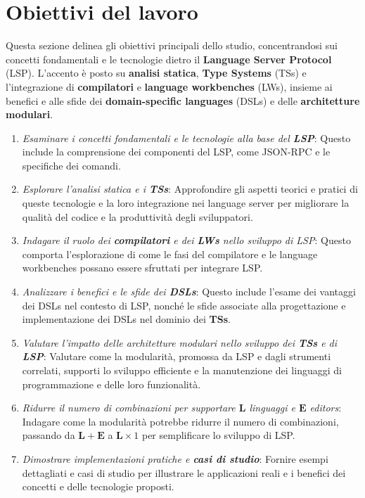 \documentclass{adapt-lab}
\begin{document}
\section{Obiettivi del lavoro}

Questa sezione delinea gli obiettivi principali dello studio, concentrandosi sui concetti fondamentali e le tecnologie dietro il \textbf{Language Server Protocol} (LSP). L'accento è posto su \textbf{analisi statica}, \textbf{Type Systems} (TSs) e l'integrazione di \textbf{compilatori} e \textbf{language workbenches} (LWs), insieme ai benefici e alle sfide dei \textbf{domain-specific languages} (DSLs) e delle \textbf{architetture modulari}.

\begin{enumerate}
    \item \textit{Esaminare i concetti fondamentali e le tecnologie alla base del \textbf{LSP}}: Questo include la comprensione dei componenti del LSP, come JSON-RPC e le specifiche dei comandi.

    \item \textit{Esplorare l'analisi statica e i \textbf{TSs}}: Approfondire gli aspetti teorici e pratici di queste tecnologie e la loro integrazione nei language server per migliorare la qualità del codice e la produttività degli sviluppatori.

    \item \textit{Indagare il ruolo dei \textbf{compilatori} e dei \textbf{LWs} nello sviluppo di LSP}: Questo comporta l'esplorazione di come le fasi del compilatore e le language workbenches possano essere sfruttati per integrare LSP.

    \item \textit{Analizzare i benefici e le sfide dei \textbf{DSLs}}: Questo include l'esame dei vantaggi dei DSLs nel contesto di LSP, nonché le sfide associate alla progettazione e implementazione dei DSLs nel dominio dei \textbf{TSs}.

    \item \textit{Valutare l'impatto delle architetture modulari nello sviluppo dei \textbf{TSs} e di \textbf{LSP}}: Valutare come la modularità, promossa da LSP e dagli strumenti correlati, supporti lo sviluppo efficiente e la manutenzione dei linguaggi di programmazione e delle loro funzionalità.

    \item \textit{Ridurre il numero di combinazioni per supportare $\mathbf{L}$ linguaggi e $\mathbf{E}$ editors}: Indagare come la modularità potrebbe ridurre il numero di combinazioni, passando da $\mathbf{L} + \mathbf{E}$ a $\mathbf{L} \times 1$ per semplificare lo sviluppo di LSP.

    \item \textit{Dimostrare implementazioni pratiche e \textbf{casi di studio}}: Fornire esempi dettagliati e casi di studio per illustrare le applicazioni reali e i benefici dei concetti e delle tecnologie proposti.
\end{enumerate}
\end{document}
